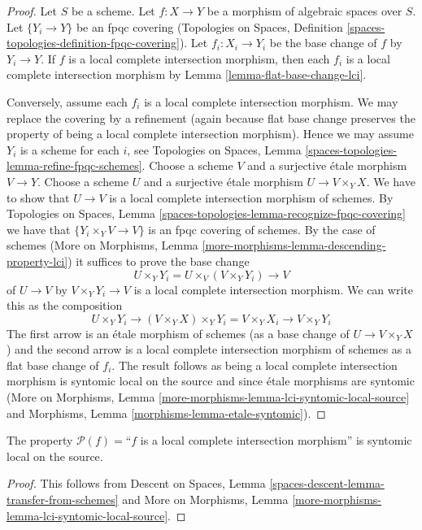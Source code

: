 \begin{proof}
Let $S$ be a scheme. Let $f : X \to Y$ be a
morphism of algebraic spaces over $S$.
Let $\{Y_i \to Y\}$ be an fpqc covering
(Topologies on Spaces, Definition
\ref{spaces-topologies-definition-fpqc-covering}).
Let $f_i : X_i \to Y_i$ be the base change of $f$ by $Y_i \to Y$.
If $f$ is a local complete intersection morphism,
then each $f_i$ is a local complete intersection morphism
by Lemma \ref{lemma-flat-base-change-lci}.

\medskip\noindent
Conversely, assume each $f_i$ is a local complete intersection morphism.
We may replace the covering by a refinement (again because
flat base change preserves the property of being a
local complete intersection morphism). Hence we may assume
$Y_i$ is a scheme for each $i$, see
Topologies on Spaces, Lemma \ref{spaces-topologies-lemma-refine-fpqc-schemes}.
Choose a scheme $V$ and a surjective \'etale morphism $V \to Y$.
Choose a scheme $U$ and a surjective \'etale morphism
$U \to V \times_Y X$. We have to show that $U \to V$ is a
local complete intersection morphism of schemes.
By Topologies on Spaces, Lemma
\ref{spaces-topologies-lemma-recognize-fpqc-covering}
we have that $\{Y_i \times_Y V \to V\}$ is an fpqc covering
of schemes. By the case of schemes
(More on Morphisms, Lemma \ref{more-morphisms-lemma-descending-property-lci})
it suffices to prove the base change
$$
U \times_Y Y_i = U \times_V (V \times_Y Y_i) \longrightarrow V
$$
of $U \to V$ by $V \times_Y Y_i \to V$ is a
local complete intersection morphism. We can write this as the
composition
$$
U \times_Y Y_i \longrightarrow
(V \times_Y X) \times_Y Y_i = V \times_Y X_i \longrightarrow
V \times_Y Y_i
$$
The first arrow is an \'etale morphism of schemes (as a base change of
$U \to V \times_Y X$) and the second arrow is a
local complete intersection morphism of schemes as a flat base change of $f_i$.
The result follows as being a local complete intersection morphism
is syntomic local on the source and since \'etale morphisms
are syntomic (More on Morphisms, Lemma
\ref{more-morphisms-lemma-lci-syntomic-local-source}
and Morphisms, Lemma \ref{morphisms-lemma-etale-syntomic}).
\end{proof}

\begin{lemma}
\label{lemma-lci-syntomic-local-source}
The property $\mathcal{P}(f) =$``$f$ is a local complete intersection
morphism'' is syntomic local on the source.
\end{lemma}

\begin{proof}
This follows from
Descent on Spaces, Lemma \ref{spaces-descent-lemma-transfer-from-schemes} and
More on Morphisms, Lemma \ref{more-morphisms-lemma-lci-syntomic-local-source}.
\end{proof}

